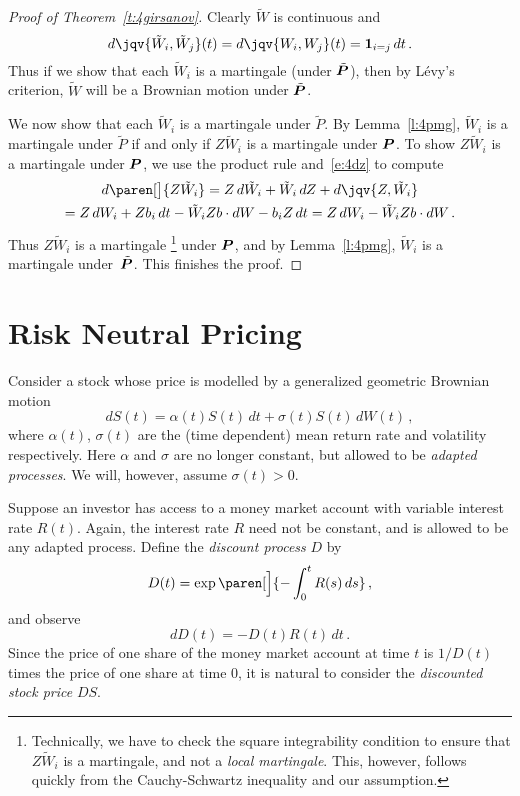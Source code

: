 \begin{proof}[Proof of Theorem~\ref{t:4girsanov}]
  Clearly $\tilde W$ is continuous and
  \begin{equation*}
    d\jqv{\tilde W_i, \tilde W_j}(t) 
      = d\jqv{W_i, W_j}(t)
      = \one_{i = j} \, dt\,.
  \end{equation*}
  Thus if we show that each $\tilde W_i$ is a martingale (under $\tilde \P$), then by L\'evy's criterion, $\tilde W$ will be a Brownian motion under $\tilde\P$.

  We now show that each $\tilde W_i$ is a martingale under $\tilde P$.
  By Lemma~\ref{l:4pmg}, $\tilde W_i$ is a martingale under $\tilde P$ if and only if $Z \tilde W_i$ is a martingale under $\P$.
  To show $Z \tilde W_i$ is a martingale under $\P$, we use the product rule and~\eqref{e:4dz} to compute
  \begin{multline*}
    d \paren[\big]{ Z \tilde W_i }
      = Z \, d\tilde W_i  + \tilde W_i \, dZ + d\jqv{Z, \tilde W_i}
  \\
      = Z \, dW_i  + Z b_i \, dt  - \tilde W_i Z b \cdot dW - b_i Z \, dt
      = Z \, dW_i - \tilde W_i Z b \cdot dW \,.
  \end{multline*}
  Thus $Z \tilde W_i$ is a martingale%
  \footnote{%
    Technically, we have to check the square integrability condition to ensure that $Z \tilde W_i$ is a martingale, and not a \emph{local martingale}.
    This, however, follows quickly from the Cauchy-Schwartz inequality and our assumption.
  }
  under $\P$, and by Lemma~\ref{l:4pmg}, $\tilde W_i$ is a martingale under~$\tilde\P$.
  This finishes the proof.
\end{proof}


\section{Risk Neutral Pricing}

Consider a stock whose price is modelled by a generalized geometric Brownian motion
\begin{equation*}
  dS(t) = \alpha(t) S(t) \, dt + \sigma(t) S(t) \, dW(t)\,,
\end{equation*}
where $\alpha(t)$, $\sigma(t)$ are the (time dependent) mean return rate and volatility respectively.
Here $\alpha$ and $\sigma$ are no longer constant, but allowed to be \emph{adapted processes}.
We will, however, assume $\sigma(t) > 0$.

Suppose an investor has access to a money market account with variable interest rate $R(t)$.
Again, the interest rate $R$ need not be constant, and is allowed to be any adapted process.
Define the \emph{discount process} $D$ by
\begin{equation*}
  D(t) = \exp\paren[\Big]{ - \int_0^t R(s) \, ds }\,,
\end{equation*}
and observe
\begin{equation*}
  dD(t) = -D(t) R(t) \, dt\,.
\end{equation*}
Since the price of one share of the money market account at time $t$ is $1/D(t)$ times the price of one share at time $0$, it is natural to consider the \emph{discounted stock price} $D S$.

